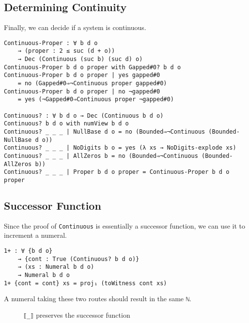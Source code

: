 \documentclass[\main/thesis.tex]{subfiles}
\begin{document}
\subsection{Determining Continuity}

Finally, we can decide if a system is continuous.

\begin{lstlisting}[basicstyle=\ttfamily\scriptsize]
Continuous-Proper : ∀ b d o
    → (proper : 2 ≤ suc (d + o))
    → Dec (Continuous (suc b) (suc d) o)
Continuous-Proper b d o proper with Gapped#0? b d o
Continuous-Proper b d o proper | yes gapped#0
    = no (Gapped#0⇒¬Continuous proper gapped#0)
Continuous-Proper b d o proper | no ¬gapped#0
    = yes (¬Gapped#0⇒Continuous proper ¬gapped#0)

Continuous? : ∀ b d o → Dec (Continuous b d o)
Continuous? b d o with numView b d o
Continuous? _ _ _ | NullBase d o = no (Bounded⇒¬Continuous (Bounded-NullBase d o))
Continuous? _ _ _ | NoDigits b o = yes (λ xs → NoDigits-explode xs)
Continuous? _ _ _ | AllZeros b = no (Bounded⇒¬Continuous (Bounded-AllZeros b))
Continuous? _ _ _ | Proper b d o proper = Continuous-Proper b d o proper
\end{lstlisting}

\subsection{Successor Function}

Since the proof of \lstinline|Continuous| is essentially a successor function,
we can use it to increment a numeral.

\begin{lstlisting}
1+ : ∀ {b d o}
    → {cont : True (Continuous? b d o)}
    → (xs : Numeral b d o)
    → Numeral b d o
1+ {cont = cont} xs = proj₁ (toWitness cont xs)
\end{lstlisting}

A numeral taking these two routes should result in the same {{\lstinline|ℕ|}}.

\begin{figure}[H]
    \centering
\caption{\lstinline|⟦_⟧| preserves the successor function}
\label{figure:30}
\end{figure}
\end{document}
